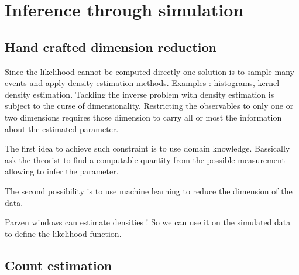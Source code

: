\section{Inference through simulation} %
\label{sec:inference_through_simulation}













\subsection{Hand crafted dimension reduction} %
\label{sub:hand_crafted_dimension_reduction}

Since the likelihood cannot be computed directly one solution is to sample many events and apply density estimation methods.
Examples : histograms, kernel density estimation.
Tackling the inverse problem with density estimation is subject to the curse of dimensionality.
Restricting the observables to only one or two dimensions requires those dimension to carry all or most the information about the estimated parameter.

The first idea to achieve such constraint is to use domain knowledge.
Bassically ask the theorist to find a computable quantity from the possible measurement allowing to infer the parameter.


The second possibility is to use machine learning to reduce the dimension of the data.


Parzen windows can estimate densities !
So we can use it on the simulated data to define the likelihood function.






\subsection{Count estimation} %
\label{sub:count_estimation}


